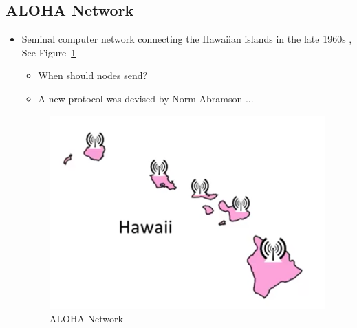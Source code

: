 \documentclass[12pt]{ctexart}   %
\begin{document}
	\subsection{ALOHA Network}
	\begin{itemize}
		\item Seminal computer network connecting the Hawaiian islands in the late 1960s , See Figure~\ref{fig:3-4-1}
		\begin{itemize}
			\item When should nodes send?
			\item A new protocol was devised by Norm Abramson ...
		\end{itemize}
		
		 \begin{figure}[h!] %
		\centering
		 \includegraphics[scale=0.7]{images/3-4-1}
		\caption{ ALOHA Network}
		 \label{fig:3-4-1}
		 \end{figure}
	\end{itemize}
	
\end{document}
